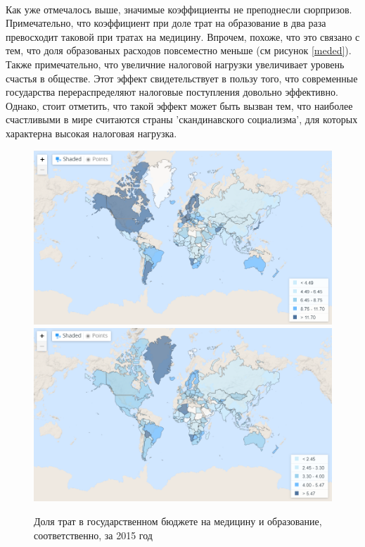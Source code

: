 \documentclass[russian]{vegareport}
\begin{document}
        \\
        Как уже отмечалось выше, значимые коэффициенты не преподнесли сюрпризов. Примечательно, что коэффициент при доле трат на образование в два раза превосходит таковой при тратах на медицину. Впрочем, похоже, что это связано с тем, что доля образованых расходов повсеместно меньше (см рисунок \ref{meded}).
        \\
        Также примечательно, что увеличние налоговой нагрузки увеличивает уровень счастья в обществе. Этот эффект свидетельствует в пользу того, что современные государства перераспределяют налоговые поступления довольно эффективно. Однако, стоит отметить, что такой эффект может быть вызван тем, что наиболее счастливыми в мире считаются страны 'скандинавского социализма', для которых характерна высокая налоговая нагрузка.
        
        \begin{figure} \label{meded}			
            \centering
            \includegraphics[scale=0.5]{Report/meded1.png}
		\includegraphics[scale=0.5]{Report/meded2.png}
		\caption{Доля трат в государственном бюджете на медицину и образование, соответственно, за 2015 год}
            \label{lect02:pic1}
	\end{figure}
\end{document}
